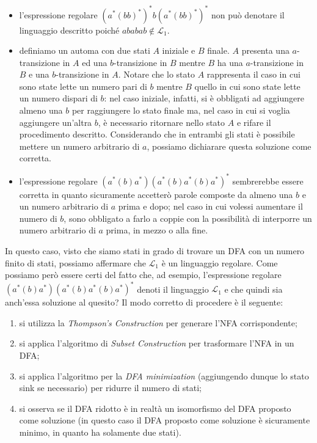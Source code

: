 \documentclass[class=book, crop=false, oneside, 12pt]{standalone}
\begin{document}
\begin{itemize}
    \item l'espressione regolare \((a^*(bb)^*)^* b(a^*(bb)^*)^*\) non può denotare il linguaggio descritto poiché \(ababab \notin \mathcal{L}_1\).
    \item definiamo un automa con due stati \(A\) iniziale e \(B\) finale. \(A\) presenta una \(a\)-transizione in \(A\) ed una \(b\)-transizione in \(B\) mentre \(B\) ha una \(a\)-transizione in \(B\) e una \(b\)-transizione in \(A\). Notare che lo stato \(A\) rappresenta il caso in cui sono state lette un numero pari di \(b\) mentre \(B\) quello in cui sono state lette un numero dispari di \(b\): nel caso iniziale, infatti, si è obbligati ad aggiungere almeno una \(b\) per raggiungere lo stato finale ma, nel caso in cui si voglia aggiungere un'altra \(b\), è necessario ritornare nello stato \(A\) e rifare il procedimento descritto. Considerando che in entrambi gli stati è possibile mettere un numero arbitrario di \(a\), possiamo dichiarare questa soluzione come corretta.
    \item l'espressione regolare \((a^*(b)a^*)(a^*(b)a^*(b)a^*)^*\) sembrerebbe essere corretta in quanto sicuramente accetterò parole composte da almeno una \(b\) e un numero arbitrario di \(a\) prima e dopo; nel caso in cui volessi aumentare il numero di \(b\), sono obbligato a farlo a coppie con la possibilità di interporre un numero arbitrario di \(a\) prima, in mezzo o alla fine. 
\end{itemize}

In questo caso, visto che siamo stati in grado di trovare un DFA con un numero finito di stati, possiamo affermare che \(\mathcal{L}_1\) è un linguaggio regolare. Come possiamo però essere certi del fatto che, ad esempio, l'espressione regolare \((a^*(b)a^*)(a^*(b)a^*(b)a^*)^*\) denoti il linguaggio \(\mathcal{L}_1\) e che quindi sia anch'essa soluzione al quesito? Il modo corretto di procedere è il seguente:

\begin{enumerate}
    \item si utilizza la \emph{Thompson's Construction} per generare l'NFA corrispondente;
    \item si applica l'algoritmo di \emph{Subset Construction} per trasformare l'NFA in un DFA;
    \item si applica l'algoritmo per la \emph{DFA minimization} (aggiungendo dunque lo stato sink se necessario) per ridurre il numero di stati;
    \item si osserva se il DFA ridotto è in realtà un isomorfismo del DFA proposto come soluzione (in questo caso il DFA proposto come soluzione è sicuramente minimo, in quanto ha solamente due stati).
\end{enumerate}
\end{document}
